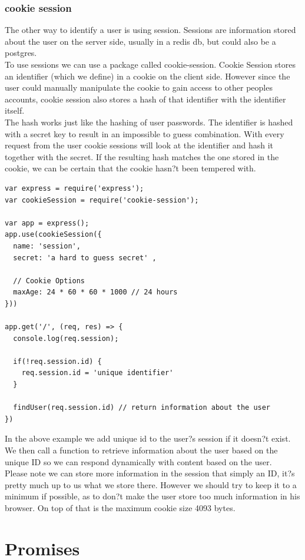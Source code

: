\documentclass[a4paper]{article}
\begin{document}
\subsubsection{cookie session}
The other way to identify a user is using session. Sessions are information stored about the user on the server side, usually in a redis db, but could also be a postgres.
\\
To use sessions we can use a package called cookie-session. Cookie Session stores an identifier (which we define) in a cookie on the client side. However since the user could manually manipulate the cookie to gain access to other peoples accounts, cookie session also stores a hash of that identifier with the identifier itself.
\\
The hash works just like the hashing of user passwords. The identifier is hashed with a secret key to result in an impossible to guess combination. With every request from the user cookie sessions will look at the identifier and hash it together with the secret. If the resulting hash matches the one stored in the cookie, we can be certain that the cookie hasn?t been tempered with.
\begin{lstlisting}
var express = require('express');
var cookieSession = require('cookie-session');

var app = express();
app.use(cookieSession({
  name: 'session',
  secret: 'a hard to guess secret' ,

  // Cookie Options
  maxAge: 24 * 60 * 60 * 1000 // 24 hours
}))

app.get('/', (req, res) => {
  console.log(req.session);

  if(!req.session.id) {
    req.session.id = 'unique identifier'
  }

  findUser(req.session.id) // return information about the user
})
\end{lstlisting}

In the above example we add unique id to the user?s session if it doesn?t exist. We then call a function to retrieve information about the user based on the unique ID so we can respond dynamically with content based on the user.
\\
Please note we can store more information in the session that simply an ID, it?s pretty much up to us what we store there. However we should try to keep it to a minimum if possible, as to don?t make the user store too much information in his browser. On top of that is the maximum cookie size 4093 bytes.
\section{Promises}
\end{document}

